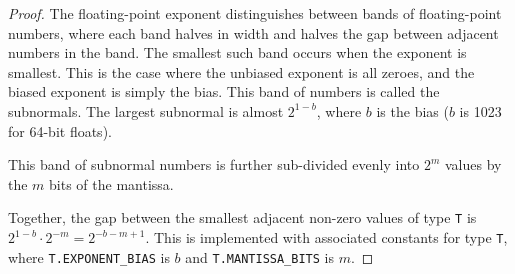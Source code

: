 \documentclass{article}
\begin{document}
\begin{proof}
    The floating-point exponent distinguishes between bands of floating-point numbers,
    where each band halves in width and halves the gap between adjacent numbers in the band.
    The smallest such band occurs when the exponent is smallest.
    This is the case where the unbiased exponent is all zeroes,
    and the biased exponent is simply the bias.
    This band of numbers is called the subnormals.
    The largest subnormal is almost $2^{1-b}$, where $b$ is the bias ($b$ is 1023 for 64-bit floats).

    This band of subnormal numbers is further sub-divided evenly into $2^m$ values by the $m$ bits of the mantissa.

    Together, the gap between the smallest adjacent non-zero values of type \texttt{T} is $2^{1-b} \cdot 2^{-m} = 2^{-b-m+1}$.
    This is implemented with associated constants for type \texttt{T},
    where \texttt{T.EXPONENT\_BIAS} is $b$ and \texttt{T.MANTISSA\_BITS} is $m$.
\end{proof}
\end{document}
